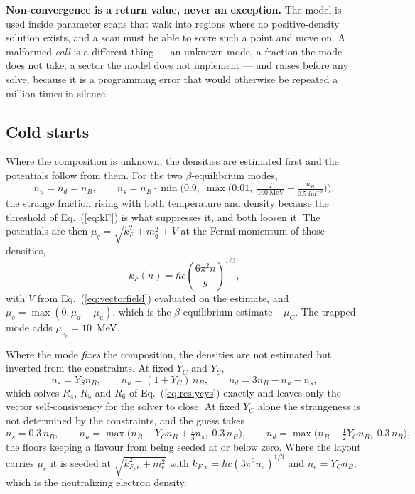 \documentclass[aps,prc,onecolumn,superscriptaddress,nofootinbib,10pt]{revtex4-2}
\newcommand{\nB}{n_B}
\newcommand{\muC}{\mu_C}
\newcommand{\munue}{\mu_{\nu_e}}
\begin{document}
\textbf{Non-convergence is a return value, never an exception.} The model is
used inside parameter scans that walk into regions where no positive-density
solution exists, and a scan must be able to score such a point and move on. A
malformed \emph{call} is a different thing --- an unknown mode, a fraction the
mode does not take, a sector the model does not implement --- and raises
before any solve, because it is a programming error that would otherwise be
repeated a million times in silence.

\subsection{Cold starts}
\label{sec:guesses}

Where the composition is unknown, the densities are estimated first and the
potentials follow from them. For the two $\beta$-equilibrium modes,
%
\begin{equation}
n_u = n_d = \nB , \qquad
n_s = \nB \cdot \min\!\Big(0.9,\; \max\big(0.01,\;
      \tfrac{T}{100\ \mathrm{MeV}} + \tfrac{\nB}{0.5\ \mathrm{fm}^{-3}}
      \big)\Big) ,
\label{eq:guess:beta}
\end{equation}
%
the strange fraction rising with both temperature and density because the
threshold of Eq.~(\ref{eq:kF}) is what suppresses it, and both loosen it. The
potentials are then $\mu_q = \sqrt{k_F^2 + m_q^2} + V$ at the Fermi momentum
of those densities,
%
\begin{equation}
k_F(n) = \hbar c \left( \frac{6 \pi^2 n}{g} \right)^{\!1/3} ,
\end{equation}
%
with $V$ from Eq.~(\ref{eq:vectorfield}) evaluated on the estimate, and
$\mu_e = \max(0, \mu_d - \mu_u)$, which is the $\beta$-equilibrium estimate
$-\muC$. The trapped mode adds $\munue = 10$~MeV.

Where the mode \emph{fixes} the composition, the densities are not estimated
but inverted from the constraints. At fixed $Y_C$ and $Y_S$,
%
\begin{equation}
n_s = Y_S \nB , \qquad
n_u = (1 + Y_C)\, \nB , \qquad
n_d = 3\nB - n_u - n_s ,
\label{eq:guess:ycys}
\end{equation}
%
which solves $R_4$, $R_5$ and $R_6$ of Eq.~(\ref{eq:res:ycys}) exactly and
leaves only the vector self-consistency for the solver to close. At fixed
$Y_C$ alone the strangeness is not determined by the constraints, and the
guess takes
%
\begin{equation}
n_s = 0.3\, \nB , \qquad
n_u = \max\big( \nB + Y_C \nB + \tfrac13 n_s,\; 0.3\, \nB \big) , \qquad
n_d = \max\big( \nB - \tfrac12 Y_C \nB,\; 0.3\, \nB \big) ,
\label{eq:guess:yc}
\end{equation}
%
the floors keeping a flavour from being seeded at or below zero. Where the
layout carries $\mu_e$ it is seeded at $\sqrt{k_{F,e}^2 + m_e^2}$ with
$k_{F,e} = \hbar c (3\pi^2 n_e)^{1/3}$ and $n_e = Y_C \nB$, which is the
neutralizing electron density.
\end{document}
